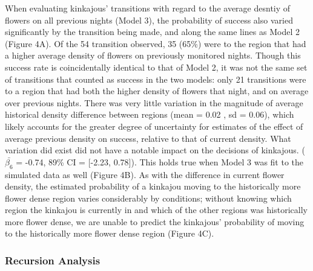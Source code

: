 \documentclass[twoside,12pt,final]{ucthesis-CA2012}
\begin{document}
\begin{ucmainmatter}
When evaluating kinkajous' transitions with regard to the average desntiy of flowers on all previous nights (Model 3), the probability of success also varied significantly by the transition being made, and along the same lines as Model 2 (Figure 4A). Of the 54 transition observed, 35 (65\%) were to the region that had a higher average density of flowers on previously monitored nights. Though this success rate is coincidentally identical to that of Model 2, it was not the same set of transitions that counted as success in the two models: only 21 transitions were to a region that had both the higher density of flowers that night, and on average over previous nights. There was very little variation in the magnitude of average historical density difference between regions (mean = 0.02 , sd = 0.06), which likely accounts for the greater degree of uncertainty for estimates of the effect of average previous density on success, relative to that of current density. What variation did exist did not have a notable impact on the decisions of kinkajous. (\(\bar{\beta_6}\) = -0.74, 89\% CI = {[}-2.23, 0.78{]}). This holds true when Model 3 was fit to the simulated data as well (Figure 4B). As with the difference in current flower density, the estimated probability of a kinkajou moving to the historically more flower dense region varies considerably by conditions; without knowing which region the kinkajou is currently in and which of the other regions was historically more flower dense, we are unable to predict the kinkajous' probability of moving to the historically more flower dense region (Figure 4C).

\hypertarget{recursion-analysis}{%
\subsubsection{Recursion Analysis}\label{recursion-analysis}}


\end{ucmainmatter}
\end{document}
